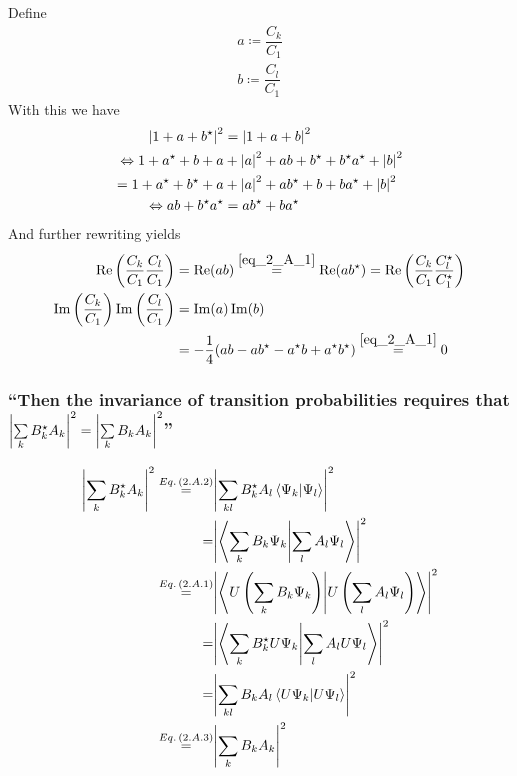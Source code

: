 Define 
\begin{align*} 
	a\coloneqq \dfrac{C_k}{C_1}\\
	b\coloneqq \dfrac{C_l}{C_1}
\end{align*}
With this we have
\begin{align} 
	\abs{1+a+b^\star}^2&=\abs{1+a+b}^2\\
	\Leftrightarrow 1 + a^\star+b+a&+\abs{a}^2+a b+b^\star+b^\star a^\star+\abs{b}^2\\
	=1 + a^\star+b^\star+a&+\abs{a}^2+a b^\star+b+b a^\star+\abs{b}^2\\
	\Leftrightarrow a b+b^\star a^\star&=a b^\star+b a^\star \label{eq_2_A_1}
\end{align}
And further rewriting yields
\begin{align*} 
	\Re\left(\dfrac{C_k}{C_1}\dfrac{C_l}{C_1}\right)&=\Re(a b)\overset{\ref{eq_2_A_1}}{=}\Re(a b^\star)=\Re\left(\dfrac{C_k}{C_1}\dfrac{C_l^\star}{C_1^\star}\right)\\
	\Im\left(\dfrac{C_k}{C_1}\right)\Im\left(\dfrac{C_l}{C_1}\right)&=\Im(a)\Im(b)\\
	&=-\dfrac{1}{4}(ab - a b^\star-a^\star b + a^\star b^\star)\overset{\ref{eq_2_A_1}}{=}0
\end{align*}

\subsubsection{\enquote{Then the invariance of transition probabilities requires that $\abs{\sum\limits_{k}B_k^\star A_k}^2=\abs{\sum\limits_{k}B_k A_k}^2$} }\label{sususec:2_A_p93_1}
\begin{align*} 
	\abs{\sum\limits_{k}B_k^\star A_k}^2\overset{\eq{2.A.2}}{=}&\abs{\sum\limits_{k l}B_k^\star A_l \innerproduct{\Psi_k}{\Psi_l}}^2\\
	=&\abs{\innerproduct{\sum\limits_{k}B_k \Psi_k}{\sum\limits_{l}A_l \Psi_l}}^2\\
	\overset{\eq{2.A.1}}{=}&\abs{\innerproduct{U\left(\sum\limits_{k}B_k \Psi_k\right)}{U\left(\sum\limits_{l}A_l \Psi_l\right)}}^2\\
	=&\abs{\innerproduct{\sum\limits_{k}B_k^\star U\Psi_k}{\sum\limits_{l}A_l U\Psi_l}}^2\\
	=&\abs{\sum\limits_{k l}B_k A_l \innerproduct{U\Psi_k}{U\Psi_l}}^2\\
	\overset{\eq{2.A.3}}{=}&\abs{\sum\limits_{k}B_k A_k}^2
\end{align*}

